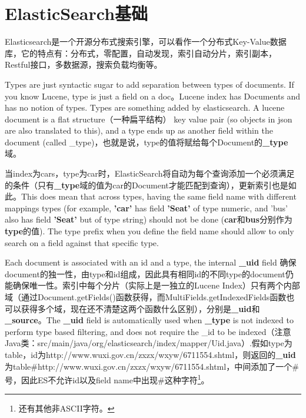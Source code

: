 \section{ElasticSearch基础}
\par Elasticsearch是一个开源分布式搜索引擎，可以看作一个分布式Key-Value数据库，它的特点有：分布式，零配置，自动发现，索引自动分片，索引副本，Restful接口，多数据源，搜索负载均衡等。
\par Types are just syntactic sugar to add separation between types of documents. If you know Lucene, type is just a field on a doc。Lucene index has Documents and has no notion of types. Types are something added by elasticsearch. A lucene document is a flat structure（一种扁平结构） key value pair (so objects in json are also translated to this), and a type ends up as another field within the document (called \_type)，也就是说，type的值将赋给每个Document的\textbf{\_type}域。
\par 当index为cars，type为car时，ElasticSearch将自动为每个查询添加一个必须满足的条件（只有\textbf{\_type}域的值为car的Document才能匹配到查询），更新索引也是如此。This does mean that across types, having the same field name with different mappings types (for example, \textbf{'car'} has field \textbf{'Seat'} of type numeric, and 'bus' also has field \textbf{'Seat'} but of type string) should not be done (\textbf{car}和\textbf{bus}分别作为\textbf{type}的值). The type prefix when you define the field name should allow to only search on a field against that specific type.
\par Each document is associated with an id and a type, the internal \textbf{\_uid} field 确保document的独一性，由type和id组成，因此具有相同id的不同type的document仍能确保唯一性。索引中每个分片（实际上是一独立的Lucene Index）只有两个内部域（通过Document.getFields()函数获得，而MultiFields.getIndexedFields函数也可以获得多个域，现在还不清楚这两个函数什么区别），分别是\textbf{\_uid}和\textbf{\_source}。The \textbf{\_uid} field is automatically used when \textbf{\_type} is not indexed to perform type based filtering, and does not require the \_id to be indexed（注意Java类：src/main/java/org/elasticsearch/index/mapper/Uid.java）.假如type为table，id为http://www.wuxi.gov.cn/zxzx/wxyw/6711554.shtml，则返回的\textbf{\_uid}为table\#http://www.wuxi.gov.cn/zxzx/wxyw/6711554.shtml，中间添加了一个\#号，因此ES不允许id以及field name中出现\#这种字符\footnote{还有其他非ASCII字符。}。
